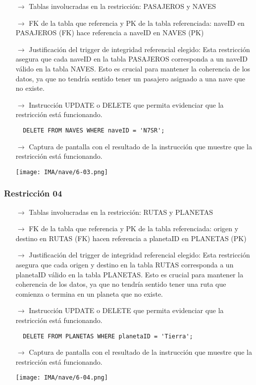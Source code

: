 \begin{itemize}
  \item[$\rightarrow$] Tablas involucradas en la restricción: PASAJEROS y NAVES
  \item[$\rightarrow$] FK de la tabla que referencia y PK de la tabla referenciada: naveID en PASAJEROS (FK) hace referencia a naveID en NAVES (PK)
  \item[$\rightarrow$] Justificación del trigger de integridad referencial elegido: Esta restricción asegura que cada naveID en la tabla PASAJEROS corresponda a un naveID válido en la tabla NAVES. Esto es crucial para mantener la coherencia de los datos, ya que no tendría sentido tener un pasajero asignado a una nave que no existe.
  \item[$\rightarrow$] Instrucción UPDATE o DELETE que permita evidenciar que la restricción está funcionando.
  \begin{verbatim}
  DELETE FROM NAVES WHERE naveID = 'N7SR';
  \end{verbatim}
  \item[$\rightarrow$] Captura de pantalla con el resultado de la instrucción que muestre que la restricción está funcionando.    
        \begin{center}
          \texttt{[image: IMA/nave/6-03.png]}
        \end{center}

\end{itemize}

\subsubsection*{Restricción 04}

\begin{itemize}
  \item[$\rightarrow$] Tablas involucradas en la restricción: RUTAS y PLANETAS
  \item[$\rightarrow$] FK de la tabla que referencia y PK de la tabla referenciada: origen y destino en RUTAS (FK) hacen referencia a planetaID en PLANETAS (PK)
  \item[$\rightarrow$] Justificación del trigger de integridad referencial elegido: Esta restricción asegura que cada origen y destino en la tabla RUTAS corresponda a un planetaID válido en la tabla PLANETAS. Esto es crucial para mantener la coherencia de los datos, ya que no tendría sentido tener una ruta que comienza o termina en un planeta que no existe.
  \item[$\rightarrow$] Instrucción UPDATE o DELETE que permita evidenciar que la restricción está funcionando.
  \begin{verbatim}  
  DELETE FROM PLANETAS WHERE planetaID = 'Tierra';  
  \end{verbatim}
  \item[$\rightarrow$] Captura de pantalla con el resultado de la instrucción que muestre que la restricción está funcionando.
    
        \begin{center}
          \texttt{[image: IMA/nave/6-04.png]}
        \end{center}

\end{itemize}


